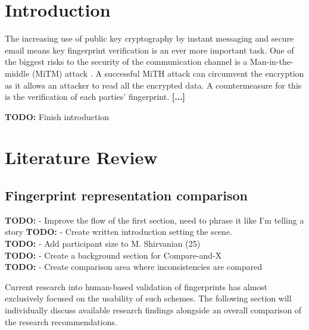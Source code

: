 \section{Introduction}
The increasing use of public key cryptography by instant messaging and secure email means key fingerprint 
verification is an ever more important task. One of the biggest risks to the security of the communication channel is a Man-in-the-middle (MiTM) attack . A successful MiTH attack can circumvent the encryption as it allows an attacker to read all the encrypted data. A countermeasure for this is the verification of each parties' fingerprint. \textbf{[...]}

\textbf{TODO: } Finish introduction

\section{Literature Review}

\subsection{Fingerprint representation comparison}

\textbf{TODO: } - Improve the flow of the first section, need to phrase it like I'm telling a story
\textbf{TODO: } - Create written introduction setting the scene. \\
\textbf{TODO: } - Add participant size to M. Shirvanian (25) \\
\textbf{TODO: } - Create a background section for Compare-and-X
\\
\textbf{TODO: } - Create comparison area where inconsistencies are compared


Current research into human-based validation of fingerprints has almost exclusively focused on the usability of such schemes. The following section will individually discuss available research findings alongside an overall comparison of the research recommendations.

